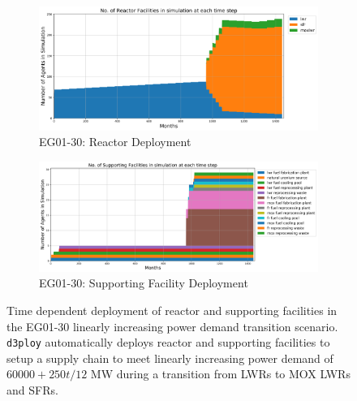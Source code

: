\documentclass[11pt]{article}
\newcommand{\deploy}{\texttt{d3ploy}\xspace}%
\begin{document}
\begin{figure}[]
	\centering
	\begin{subfigure}[t]{1.2\textwidth}
		\centering
		\includegraphics[width=\linewidth]{30-figures/eg30-stack_reactor.png} 
		\caption{EG01-30: Reactor Deployment}
		\label{fig:30reactor}
	\end{subfigure}
	\vspace{1cm}
	\begin{subfigure}[t]{1.2\textwidth}
		\centering
		\includegraphics[width=\linewidth]{30-figures/eg30-stack_support.png} 
		\caption{EG01-30: Supporting Facility Deployment}
		\label{fig:30support}
	\end{subfigure}
	\hfill
	\caption{Time dependent deployment of reactor and supporting facilities in 
	the EG01-30 linearly increasing power demand transition scenario. 
	\deploy automatically deploys reactor and supporting facilities 
	to setup a supply chain to meet linearly increasing power demand of $60000 + 250t/12$ MW
	during a transition from \glspl{LWR} to MOX LWRs and \glspl{SFR}. }
	\label{fig:30stack}
\end{figure}

\pagebreak

\end{document}
